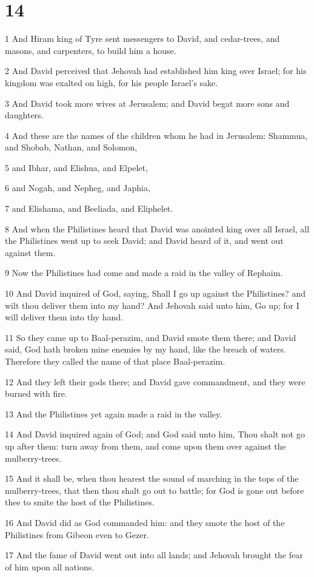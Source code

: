 \chapter{14}

\par 1 And Hiram king of Tyre sent messengers to David, and cedar-trees, and masons, and carpenters, to build him a house.
\par 2 And David perceived that Jehovah had established him king over Israel; for his kingdom was exalted on high, for his people Israel's sake.
\par 3 And David took more wives at Jerusalem; and David begat more sons and daughters.
\par 4 And these are the names of the children whom he had in Jerusalem: Shammua, and Shobab, Nathan, and Solomon,
\par 5 and Ibhar, and Elishua, and Elpelet,
\par 6 and Nogah, and Nepheg, and Japhia,
\par 7 and Elishama, and Beeliada, and Eliphelet.
\par 8 And when the Philistines heard that David was anointed king over all Israel, all the Philistines went up to seek David: and David heard of it, and went out against them.
\par 9 Now the Philistines had come and made a raid in the valley of Rephaim.
\par 10 And David inquired of God, saying, Shall I go up against the Philistines? and wilt thou deliver them into my hand? And Jehovah said unto him, Go up; for I will deliver them into thy hand.
\par 11 So they came up to Baal-perazim, and David smote them there; and David said, God hath broken mine enemies by my hand, like the breach of waters. Therefore they called the name of that place Baal-perazim.
\par 12 And they left their gods there; and David gave commandment, and they were burned with fire.
\par 13 And the Philistines yet again made a raid in the valley.
\par 14 And David inquired again of God; and God said unto him, Thou shalt not go up after them: turn away from them, and come upon them over against the mulberry-trees.
\par 15 And it shall be, when thou hearest the sound of marching in the tops of the mulberry-trees, that then thou shalt go out to battle; for God is gone out before thee to smite the host of the Philistines.
\par 16 And David did as God commanded him: and they smote the host of the Philistines from Gibeon even to Gezer.
\par 17 And the fame of David went out into all lands; and Jehovah brought the fear of him upon all nations.


